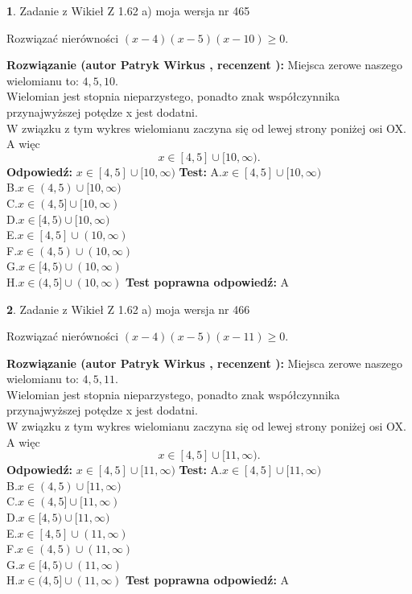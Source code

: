\documentclass[12pt, a4paper]{article}
\theoremstyle{definition} %
\newtheorem{zad}{}
\newcommand{\zadStart}[1]{\begin{zad}#1\newline}
\newcommand{\zadStop}{\end{zad}}
\newcommand{\rozwStart}[2]{\noindent \textbf{Rozwiązanie (autor #1 , recenzent #2): }\newline}
\newcommand{\rozwStop}{\newline}
\newcommand{\odpStart}{\noindent \textbf{Odpowiedź:}\newline}
\newcommand{\odpStop}{\newline}
\newcommand{\testStart}{\noindent \textbf{Test:}\newline}
\newcommand{\testStop}{\newline}
\newcommand{\kluczStart}{\noindent \textbf{Test poprawna odpowiedź:}\newline}
\newcommand{\kluczStop}{\newline}
\begin{document}
\zadStart{Zadanie z Wikieł Z 1.62 a) moja wersja nr 465}

Rozwiązać nierówności $(x-4)(x-5)(x-10)\ge0$.
\zadStop
\rozwStart{Patryk Wirkus}{}
Miejsca zerowe naszego wielomianu to: $4, 5, 10$.\\
Wielomian jest stopnia nieparzystego, ponadto znak współczynnika przy\linebreak najwyższej potędze x jest dodatni.\\ W związku z tym wykres wielomianu zaczyna się od lewej strony poniżej osi OX. A więc $$x \in [4,5] \cup [10,\infty).$$
\rozwStop
\odpStart
$x \in [4,5] \cup [10,\infty)$
\odpStop
\testStart
A.$x \in [4,5] \cup [10,\infty)$\\
B.$x \in (4,5) \cup [10,\infty)$\\
C.$x \in (4,5] \cup [10,\infty)$\\
D.$x \in [4,5) \cup [10,\infty)$\\
E.$x \in [4,5] \cup (10,\infty)$\\
F.$x \in (4,5) \cup (10,\infty)$\\
G.$x \in [4,5) \cup (10,\infty)$\\
H.$x \in (4,5] \cup (10,\infty)$
\testStop
\kluczStart
A
\kluczStop



\zadStart{Zadanie z Wikieł Z 1.62 a) moja wersja nr 466}

Rozwiązać nierówności $(x-4)(x-5)(x-11)\ge0$.
\zadStop
\rozwStart{Patryk Wirkus}{}
Miejsca zerowe naszego wielomianu to: $4, 5, 11$.\\
Wielomian jest stopnia nieparzystego, ponadto znak współczynnika przy\linebreak najwyższej potędze x jest dodatni.\\ W związku z tym wykres wielomianu zaczyna się od lewej strony poniżej osi OX. A więc $$x \in [4,5] \cup [11,\infty).$$
\rozwStop
\odpStart
$x \in [4,5] \cup [11,\infty)$
\odpStop
\testStart
A.$x \in [4,5] \cup [11,\infty)$\\
B.$x \in (4,5) \cup [11,\infty)$\\
C.$x \in (4,5] \cup [11,\infty)$\\
D.$x \in [4,5) \cup [11,\infty)$\\
E.$x \in [4,5] \cup (11,\infty)$\\
F.$x \in (4,5) \cup (11,\infty)$\\
G.$x \in [4,5) \cup (11,\infty)$\\
H.$x \in (4,5] \cup (11,\infty)$
\testStop
\kluczStart
A
\kluczStop
\end{document}
